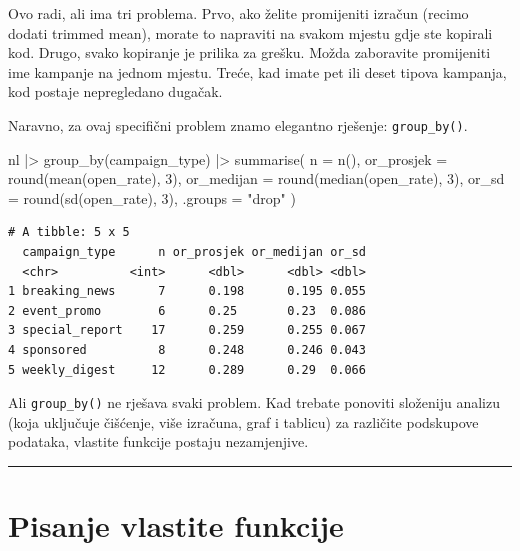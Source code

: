 \documentclass[
  croatian,
  letterpaper,
  DIV=11,
  numbers=noendperiod]{scrartcl}
\newenvironment{Shaded}{\begin{snugshade}}{\end{snugshade}}
\newcommand{\AttributeTok}[1]{\textcolor[rgb]{0.40,0.45,0.13}{#1}}
\newcommand{\DecValTok}[1]{\textcolor[rgb]{0.68,0.00,0.00}{#1}}
\newcommand{\FunctionTok}[1]{\textcolor[rgb]{0.28,0.35,0.67}{#1}}
\newcommand{\NormalTok}[1]{\textcolor[rgb]{0.00,0.23,0.31}{#1}}
\newcommand{\SpecialCharTok}[1]{\textcolor[rgb]{0.37,0.37,0.37}{#1}}
\newcommand{\StringTok}[1]{\textcolor[rgb]{0.13,0.47,0.30}{#1}}
\begin{document}
Ovo radi, ali ima tri problema. Prvo, ako želite promijeniti izračun
(recimo dodati trimmed mean), morate to napraviti na svakom mjestu gdje
ste kopirali kod. Drugo, svako kopiranje je prilika za grešku. Možda
zaboravite promijeniti ime kampanje na jednom mjestu. Treće, kad imate
pet ili deset tipova kampanja, kod postaje nepregledano dugačak.

Naravno, za ovaj specifični problem znamo elegantno rješenje:
\texttt{group\_by()}.

\begin{Shaded}
\begin{Highlighting}[]
\NormalTok{nl }\SpecialCharTok{|\textgreater{}}
  \FunctionTok{group\_by}\NormalTok{(campaign\_type) }\SpecialCharTok{|\textgreater{}}
  \FunctionTok{summarise}\NormalTok{(}
    \AttributeTok{n =} \FunctionTok{n}\NormalTok{(),}
    \AttributeTok{or\_prosjek =} \FunctionTok{round}\NormalTok{(}\FunctionTok{mean}\NormalTok{(open\_rate), }\DecValTok{3}\NormalTok{),}
    \AttributeTok{or\_medijan =} \FunctionTok{round}\NormalTok{(}\FunctionTok{median}\NormalTok{(open\_rate), }\DecValTok{3}\NormalTok{),}
    \AttributeTok{or\_sd =} \FunctionTok{round}\NormalTok{(}\FunctionTok{sd}\NormalTok{(open\_rate), }\DecValTok{3}\NormalTok{),}
    \AttributeTok{.groups =} \StringTok{"drop"}
\NormalTok{  )}
\end{Highlighting}
\end{Shaded}

\begin{verbatim}
# A tibble: 5 x 5
  campaign_type      n or_prosjek or_medijan or_sd
  <chr>          <int>      <dbl>      <dbl> <dbl>
1 breaking_news      7      0.198      0.195 0.055
2 event_promo        6      0.25       0.23  0.086
3 special_report    17      0.259      0.255 0.067
4 sponsored          8      0.248      0.246 0.043
5 weekly_digest     12      0.289      0.29  0.066
\end{verbatim}

Ali \texttt{group\_by()} ne rješava svaki problem. Kad trebate ponoviti
složeniju analizu (koja uključuje čišćenje, više izračuna, graf i
tablicu) za različite podskupove podataka, vlastite funkcije postaju
nezamjenjive.

\begin{center}\rule{0.5\linewidth}{0.5pt}\end{center}

\section{Pisanje vlastite funkcije}\label{sec-funkcije}
\end{document}
